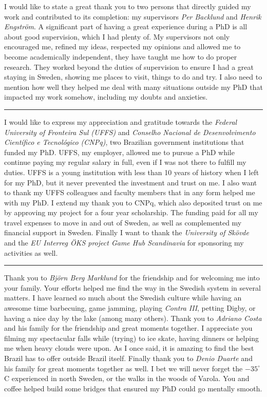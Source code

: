I would like to state a great thank you to two persons that directly guided my work and contributed to its completion: my supervisors \textit{Per Backlund} and \textit{Henrik Engstr{\"o}m}. A significant part of having a great experience during a PhD is all about good supervision, which I had plenty of. My supervisors not only encouraged me, refined my ideas, respected my opinions and allowed me to become academically independent, they have taught me how to do proper research. They worked beyond the duties of supervision to ensure I had a great staying in Sweden, showing me places to visit, things to do and try. I also need to mention how well they helped me deal with many situations outside my PhD that impacted my work somehow, including my doubts and anxieties.

\vspace{7pt}\hrule\vspace{5pt}

I would like to express my appreciation and gratitude towards the \textit{Federal University of Fronteira Sul (UFFS)} and \textit{Conselho Nacional de Desenvolvimento Cient\'{i}fico e Tecnol\'{o}gico (CNPq)}, two Brazilian government institutions that funded my PhD. UFFS, my employer, allowed me to pursue a PhD while continue paying my regular salary in full, even if I was not there to fulfill my duties. UFFS is a young institution with less than 10 years of history when I left for my PhD, but it never prevented the investment and trust on me. I also want to thank my UFFS colleagues and faculty members that in any form helped me with my PhD. I extend my thank you to CNPq, which also deposited trust on me by approving my project for a four year scholarship. The funding paid for all my travel expenses to move in and out of Sweden, as well as complemented my financial support in Sweden. Finally I want to thank the \textit{University of Sk\"ovde} and the \textit{EU Interreg \"OKS project Game Hub Scandinavia} for sponsoring my activities as well.

\vspace{7pt}\hrule\vspace{5pt}

Thank you to \textit{Bj{\"o}rn Berg Marklund} for the friendship and for welcoming me into your family. Your efforts helped me find the way in the Swedish system in several matters. I have learned so much about the Swedish culture while having an awesome time barbecuing, game jamming, playing \textit{Contra III}, petting Digby, or having a nice day by the lake (among many others). Thank you to \textit{Adriano Costa} and his family for the friendship and great moments together. I appreciate you filming my spectacular falls while (trying) to ice skate, having dinners or helping me when heavy clouds were upon. As I once said, it is amazing to find the best Brazil has to offer outside Brazil itself. Finally thank you to \textit{Denio Duarte} and his family for great moments together as well. I bet we will never forget the $-35^{\circ}$C experienced in north Sweden, or the walks in the woods of Varola. You and coffee helped build some bridges that ensured my PhD could go mentally smooth.


